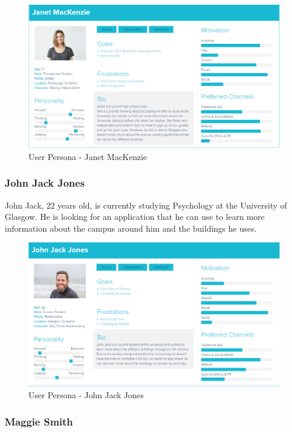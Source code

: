 \documentclass[a4,10pt,twocolumn]{article}
\begin{document}
\begin{figure}[!h]
    \centering
    \includegraphics[width=1\columnwidth]{UserPersonaImage_Janet.PNG}
    \caption{User Persona - Janet MacKenzie}
    \label{fig:user1}
\end{figure}

\subsubsection{John Jack Jones}

John Jack, 22 years old, is currently studying Psychology at the University of Glasgow. He is looking for an application that he can use to learn more information about the campus around him and the buildings he uses. 

\begin{figure}[!h]
    \centering
    \includegraphics[width=1\columnwidth]{UserPersonaImage_John.PNG}
    \caption{User Persona - John Jack Jones}
    \label{fig:user2}    
\end{figure}

\subsubsection{Maggie Smith}
\end{document}
